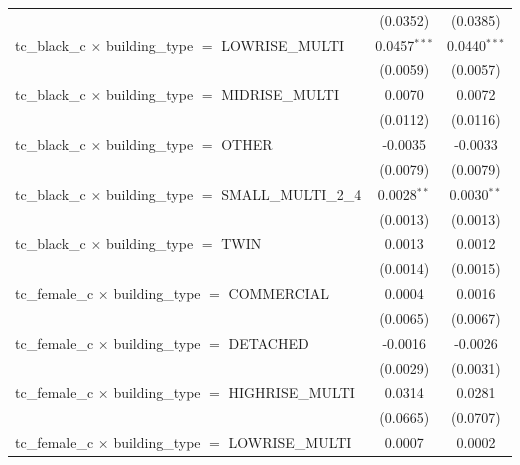 \begin{tabular}{lcc}
                                                                       & (0.0352)        & (0.0385)\\   
   tc\_black\_c $\times$ building\_type $=$ LOWRISE\_MULTI             & 0.0457$^{***}$  & 0.0440$^{***}$\\   
                                                                       & (0.0059)        & (0.0057)\\   
   tc\_black\_c $\times$ building\_type $=$ MIDRISE\_MULTI             & 0.0070          & 0.0072\\   
                                                                       & (0.0112)        & (0.0116)\\   
   tc\_black\_c $\times$ building\_type $=$ OTHER                      & -0.0035         & -0.0033\\   
                                                                       & (0.0079)        & (0.0079)\\   
   tc\_black\_c $\times$ building\_type $=$ SMALL\_MULTI\_2\_4         & 0.0028$^{**}$   & 0.0030$^{**}$\\   
                                                                       & (0.0013)        & (0.0013)\\   
   tc\_black\_c $\times$ building\_type $=$ TWIN                       & 0.0013          & 0.0012\\   
                                                                       & (0.0014)        & (0.0015)\\   
   tc\_female\_c $\times$ building\_type $=$ COMMERCIAL                & 0.0004          & 0.0016\\   
                                                                       & (0.0065)        & (0.0067)\\   
   tc\_female\_c $\times$ building\_type $=$ DETACHED                  & -0.0016         & -0.0026\\   
                                                                       & (0.0029)        & (0.0031)\\   
   tc\_female\_c $\times$ building\_type $=$ HIGHRISE\_MULTI           & 0.0314          & 0.0281\\   
                                                                       & (0.0665)        & (0.0707)\\   
   tc\_female\_c $\times$ building\_type $=$ LOWRISE\_MULTI            & 0.0007          & 0.0002\\   

\end{tabular}
